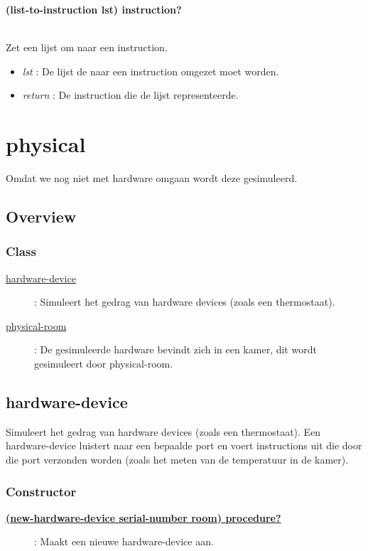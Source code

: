 \documentclass{article}
\newcommand{\ar}{\ding{213} }
\newcommand{\code}[1]{\textcolor{code}{#1}}
\newcommand{\lb}[1][]{\code{(#1}}
\newcommand{\rb}{\code{)}}
\newcommand{\racket}[1]{
	{\color{blue}\textbf{#1}}
}
\begin{document}
		\begin{framed}
			\hypertarget{parser:list-to-instruction}{\racket{\lb[list-to-instruction] lst\rb \ar \code{instruction?}}}
			\\Zet een lijst om naar een instruction.
			\begin{itemize}
				\item \emph{lst} : De lijst de naar een instruction omgezet moet worden.
				\item \emph{return} : De instruction die de lijst representeerde.
			\end{itemize}
		\end{framed}
		
\newpage
\hypertarget{physical}{\section{physical}}
Omdat we nog niet met hardware omgaan wordt deze gesimuleerd. 

\subsection{Overview}

\subsubsection{Class}
\begin{description}
		\item[\hyperlink{hardware-device}{hardware-device}] : Simuleert het gedrag van hardware devices (zoals een thermostaat).
		\item[\hyperlink{physical-room}{physical-room}] : De gesimuleerde hardware bevindt zich in een kamer, dit wordt gesimuleert door physical-room.
\end{description}

\newpage
\hypertarget{hardware-device}{\subsection{hardware-device}}
Simuleert het gedrag van hardware devices (zoals een thermostaat). Een hardware-device luistert naar een bepaalde port en voert instructions uit die door die port verzonden worden (zoals het meten van de temperatuur in de kamer).

\subsubsection{Constructor}
\begin{description}
	\item[\hyperlink{hardware-device:new-hardware-device}{\racket{\lb[new-hardware-device] serial-number room\rb \ar \code{procedure?}}}] : Maakt een nieuwe hardware-device aan.
\end{description}
\end{document}
